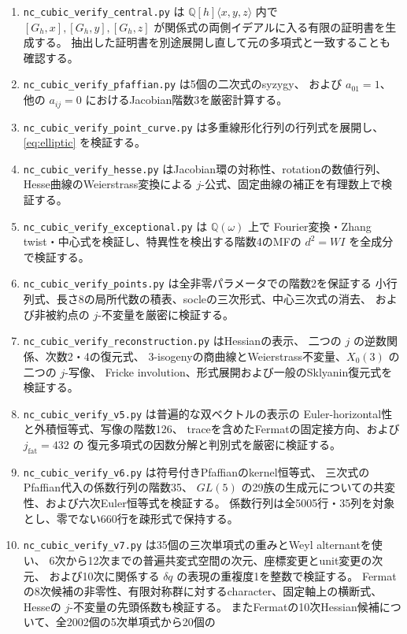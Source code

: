 \documentclass[a4paper,11pt]{ltjsarticle}
\theoremstyle{definition}
\begin{document}
\begin{enumerate}
 \item \texttt{nc\_cubic\_verify\_central.py} は $\mathbb Q[h]\langle x,y,z\rangle$ 内で
 $[G_h,x],[G_h,y],[G_h,z]$ が関係式の両側イデアルに入る有限の証明書を生成する。
 抽出した証明書を別途展開し直して元の多項式と一致することも確認する。
 \item \texttt{nc\_cubic\_verify\_pfaffian.py} は5個の二次式のsyzygy、
 および $a_{01}=1$、他の $a_{ij}=0$ におけるJacobian階数3を厳密計算する。
 \item \texttt{nc\_cubic\_verify\_point\_curve.py} は多重線形化行列の行列式を展開し、
 \eqref{eq:elliptic} を検証する。
 \item \texttt{nc\_cubic\_verify\_hesse.py} はJacobian環の対称性、rotationの数値行列、
 Hesse曲線のWeierstrass変換による $j$-公式、固定曲線の補正を有理数上で検証する。
 \item \texttt{nc\_cubic\_verify\_exceptional.py} は $\mathbb Q(\omega)$ 上で
 Fourier変換・Zhang twist・中心式を検証し、特異性を検出する階数4のMFの
 $d^2=W I$ を全成分で検証する。
 \item \texttt{nc\_cubic\_verify\_points.py} は全非零パラメータでの階数2を保証する
 小行列式、長さ8の局所代数の積表、socleの三次形式、中心三次式の消去、
 および非被約点の $j$-不変量を厳密に検証する。
 \item \texttt{nc\_cubic\_verify\_reconstruction.py} はHessianの表示、
 二つの $j$ の逆数関係、次数2・4の復元式、
 3-isogenyの商曲線とWeierstrass不変量、$X_0(3)$ の二つの $j$-写像、
 Fricke involution、形式展開および一般のSklyanin復元式を検証する。
 \item \texttt{nc\_cubic\_verify\_v5.py} は普遍的な双ベクトルの表示の
 Euler-horizontal性と外積恒等式、写像の階数126、
 traceを含めたFermatの固定接方向、および $j_{\mathrm{fat}}=432$ の
 復元多項式の因数分解と判別式を厳密に検証する。
 \item \texttt{nc\_cubic\_verify\_v6.py} は符号付きPfaffianのkernel恒等式、
 三次式のPfaffian代入の係数行列の階数35、
 $GL(5)$ の29族の生成元についての共変性、および六次Euler恒等式を検証する。
 係数行列は全5005行・35列を対象とし、零でない660行を疎形式で保持する。
 \item \texttt{nc\_cubic\_verify\_v7.py} は35個の三次単項式の重みとWeyl alternantを使い、
 6次から12次までの普遍共変式空間の次元、座標変更とunit変更の次元、
 および10次に関係する $\delta q$ の表現の重複度1を整数で検証する。
 Fermatの8次候補の非零性、有限対称群に対するcharacter、固定軸上の横断式、
 Hesseの $j$-不変量の先頭係数も検証する。
 またFermatの10次Hessian候補について、全2002個の5次単項式から20個の

\end{enumerate}
\end{document}
